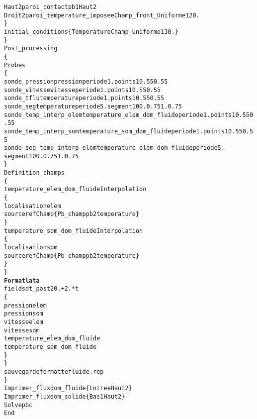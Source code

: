 \begin{alltt}
            Haut2  paroi_contact pb1  Haut2
            Droit2 paroi_temperature_imposee    Champ_front_Uniforme 1 20.
        \}
        initial_conditions \{ Temperature Champ_Uniforme 1 30. \}
    \}
    Post_processing
    \{
        Probes
        \{
            sonde_pression  pression periode 1.     points 1    0.55 0.55
            sonde_vitesse   vitesse periode 1.      points 1    0.55 0.55
            sonde_tflu      temperature periode 1.  points 1    0.55 0.55
            sonde_seg       temperature periode 5.  segment 10 0. 0.75 1. 0.75
            sonde_temp_interp_elem temperature_elem_dom_fluide periode 1. points 1   0.55 0.55
            sonde_temp_interp_som  temperature_som_dom_fluide  periode 1. points 1   0.55 0.55
            sonde_seg_temp_interp_elem temperature_elem_dom_fluide periode 5. 
                                                                    segment 10 0. 0.75 1. 0.75
        \}
        Definition_champs 
        \{
            temperature_elem_dom_fluide Interpolation
            \{
                localisation elem
                source refChamp \{ Pb_champ pb2 temperature \}
            \}
            temperature_som_dom_fluide Interpolation 
            \{
                localisation som
                source refChamp \{ Pb_champ pb2 temperature \}
            \}
        \}
        {\bf{Format lata}}
        fields dt_post 20.+2.*t
        \{
            pression elem
            pression som
            vitesse elem
            vitesse som
            temperature_elem_dom_fluide
            temperature_som_dom_fluide
        \}
    \}
    sauvegarde formatte fluide.rep
\}
Imprimer_flux dom_fluide \{ Entree Haut2 \}
Imprimer_flux dom_solide \{ Bas1 Haut2 \}
Solve pbc
End
\end{alltt}
